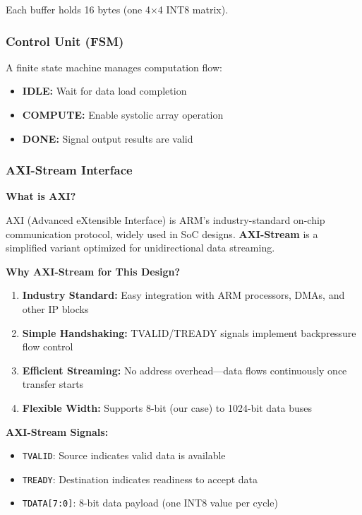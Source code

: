 \documentclass[12pt,a4paper]{article}
\begin{document}
Each buffer holds 16 bytes (one 4×4 INT8 matrix).

\subsubsection{Control Unit (FSM)}

A finite state machine manages computation flow:
\begin{itemize}
    \item \textbf{IDLE:} Wait for data load completion
    \item \textbf{COMPUTE:} Enable systolic array operation
    \item \textbf{DONE:} Signal output results are valid
\end{itemize}

\subsubsection{AXI-Stream Interface}

\textbf{What is AXI?}

AXI (Advanced eXtensible Interface) is ARM's industry-standard on-chip communication protocol, widely used in SoC designs. \textbf{AXI-Stream} is a simplified variant optimized for unidirectional data streaming.

\textbf{Why AXI-Stream for This Design?}

\begin{enumerate}
    \item \textbf{Industry Standard:} Easy integration with ARM processors, DMAs, and other IP blocks
    \item \textbf{Simple Handshaking:} TVALID/TREADY signals implement backpressure flow control
    \item \textbf{Efficient Streaming:} No address overhead—data flows continuously once transfer starts
    \item \textbf{Flexible Width:} Supports 8-bit (our case) to 1024-bit data buses
\end{enumerate}

\textbf{AXI-Stream Signals:}
\begin{itemize}
    \item \texttt{TVALID}: Source indicates valid data is available
    \item \texttt{TREADY}: Destination indicates readiness to accept data
    \item \texttt{TDATA[7:0]}: 8-bit data payload (one INT8 value per cycle)
\end{itemize}
\end{document}
